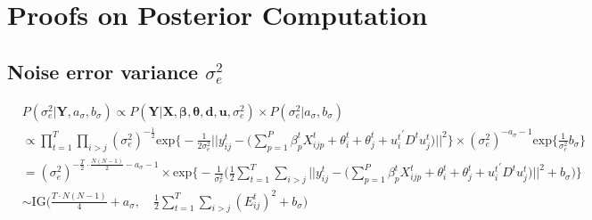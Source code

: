 \documentclass[a4paper]{article}
\begin{document}
\section{Proofs on Posterior Computation}
\subsection{Noise error variance $\sigma_e^2$} \label{sigma2}
\begin{equation}
\begin{aligned}
&P(\sigma_e^2|\mathbf{Y}, a_\sigma, b_\sigma) \propto P(\mathbf{Y}|\mathbf{X}, \boldsymbol{\beta}, \boldsymbol{\theta}, \boldsymbol{d}, \boldsymbol{u},\sigma_e^2)\times P(\sigma_e^2|a_\sigma, b_\sigma)\\
&\propto\prod\limits_{t=1}^T\prod\limits_{i> j}(\sigma_e^2)^{-\frac{1}{2}}\mbox{exp}\Big\{-\frac{1}{2\sigma_e^2}||y^t_{ij}-\big(\sum\limits_{p=1}^P \beta^t_{p}X^t_{ijp}+\theta^t_{i}+\theta^t_{j}+{u^t_{i}}^\prime D^tu^t_{j}\big)||^2\Big\}\times (\sigma_e^2)^{-a_\sigma-1}\mbox{exp}\Big\{\frac{1}{\sigma_e^2}b_\sigma\Big\}\\
&=(\sigma_e^2)^{-\frac{T}{2}\cdot\frac{N(N-1)}{2}-a_\sigma-1}\times\mbox{exp}\Big\{-\frac{1}{\sigma_e^2}\Big(\frac{1}{2}\sum\limits_{t=1}^T\sum\limits_{i> j}||y^t_{ij}-\big(\sum\limits_{p=1}^P \beta^t_{p}X^t_{ijp}+\theta^t_{i}+\theta^t_{j}+{u^t_{i}}^\prime D^tu^t_{j}\big)||^2+b_\sigma\Big)\Big\}\\
&\sim \mbox{IG}\big(\frac{T\cdot N(N-1)}{4}+a_\sigma,\quad \frac{1}{2}\sum\limits_{t=1}^T\sum\limits_{i> j}(E^t_{ij})^2+b_\sigma\big)	
\end{aligned}
\end{equation} 
\end{document}
